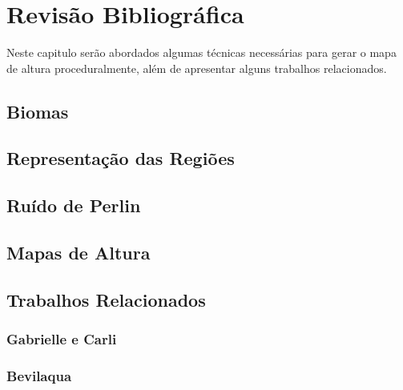\chapter{Revisão Bibliográfica}
Neste capitulo serão abordados algumas técnicas necessárias para gerar o mapa
de altura proceduralmente, além de apresentar alguns trabalhos relacionados.

\section{Biomas}

\section{Representação das Regiões}

\section{Ruído de Perlin}

\section{Mapas de Altura}

\section{Trabalhos Relacionados}

\subsection{Gabrielle e Carli}

\subsection{Bevilaqua}